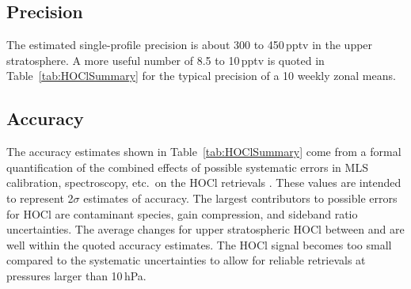 \subsection{Precision}

The estimated single-profile precision is about 300 to 450\,pptv in the upper stratosphere. A more useful number of 8.5 to 10\,pptv is quoted in Table~\ref{tab:HOClSummary} for the typical precision of a 10\degsym{} weekly zonal means. 

\subsection{Accuracy}

The accuracy estimates shown in Table~\ref{tab:HOClSummary} come from a formal quantification of the combined effects of possible systematic errors in MLS calibration, spectroscopy, etc.\ on the HOCl retrievals \citep{ReadEtal:2007}. These values are intended to represent 2$\sigma$ estimates of accuracy. The largest contributors to possible errors for HOCl are contaminant species, gain compression, and sideband ratio uncertainties. The average changes for upper stratospheric HOCl between \prevv and \thisv are well within the quoted accuracy estimates. The HOCl signal becomes too small compared to the systematic uncertainties to allow for reliable retrievals at pressures larger than 10\,hPa.

